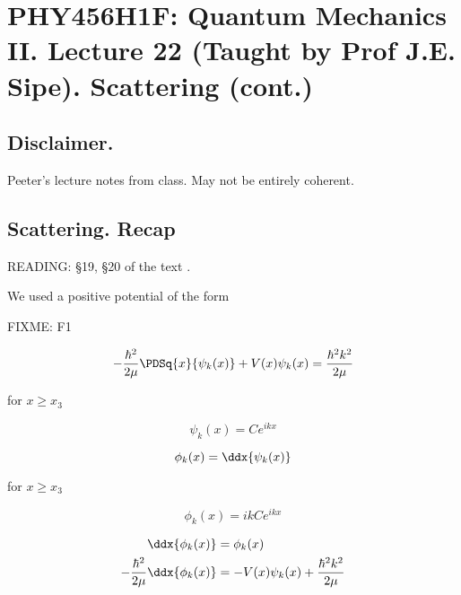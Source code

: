 
%

\chapter{PHY456H1F: Quantum Mechanics II.  Lecture 22 (Taught by Prof J.E. Sipe).  Scattering (cont.)}
\label{chap:qmTwoL22}
{}
\date{Nov 28, 2011}

\beginArtWithToc

\section{Disclaimer.}

Peeter's lecture notes from class.  May not be entirely coherent.

\section{Scattering.  Recap}

READING: \S 19, \S 20 of the text \cite{desai2009quantum}.

We used a positive potential of the form

FIXME: F1

\begin{equation}\label{eqn:qmTwoL22:10}
-\frac{\hbar^2}{2 \mu} \PDSq{x}{\psi_k(x)} + V(x) \psi_k(x) = \frac{\hbar^2 k^2}{2 \mu}
\end{equation}

for $x \ge x_3$

\begin{equation}\label{eqn:qmTwoL22:30}
\psi_k(x) = C e^{i k x}
\end{equation}

\begin{equation}\label{eqn:qmTwoL22:50}
\phi_k(x) = \ddx{\psi_k(x)}
\end{equation}

for $x \ge x_3$ 

\begin{equation}\label{eqn:qmTwoL22:70}
\phi_k(x) = i k C e^{i k x}
\end{equation}

\begin{align}\label{eqn:qmTwoL22:90}
\ddx{\phi_k(x)} &= \phi_k(x) \\
-\frac{\hbar^2}{2 \mu} \ddx{\phi_k(x)} &= - V(x) \psi_k(x) + \frac{\hbar^2 k^2}{2 \mu}
\end{align}


